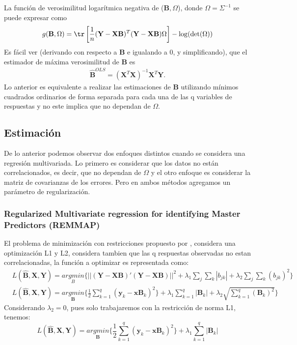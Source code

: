 \documentclass{article}
\newcommand{\X}{\mathbf{X}}
\newcommand{\x}{\mathbf{x}}
\newcommand{\Y}{\mathbf{Y}}
\newcommand{\y}{\mathbf{y}}
\newcommand{\B}{\mathbf{B}}
\begin{document}
La función de verosimilitud logarítmica negativa de ($\B, \Omega$), donde $\Omega = \Sigma^{-1}$ se puede expresar como 
\begin{align} \label{log_verosimilitud}
    g(\B,\Omega) = \tr \left[ \frac{1}{n}(\Y-\X\B)^T(\Y-\X\B)\Omega \right] -\log(\det(\Omega))
\end{align}
Es fácil ver (derivando con respecto a $\B$ e igualando a 0, y simplificando), que el estimador de máxima verosimilitud de $\B$ es 
\begin{align} \label{estimador_B_OLS}
    \hat{\B}^{OLS}=(\X^T\X)^{-1}\X^T\Y.
\end{align}
Lo anterior es equivalente a realizar las estimaciones de $\B$ utilizando mínimos cuadrados ordinarios de forma separada para cada una de las q variables de respuestas y no este implica que no dependan  de $\Omega.$ 

\subsection{Estimación}
De lo anterior podemos observar dos enfoques distintos cuando se considera una regresión multivariada. Lo primero es considerar que los datos no están correlacionados, es decir, que no dependan de $\Omega$ y el otro enfoque es considerar la matriz de covarianzas de los errores. Pero en ambos métodos agregamos un parámetro de regularización.

\subsubsection{Regularized  Multivariate regression for identifying Master Predictors (REMMAP)}

El problema de minimización con restricciones propuesto por \citep{remap}, considera una optimización L1 y L2, considera tambien que las q respuestas observadas no estan correlacionadas,  la función a optimizar es representada como:
\begin{align*}
&L(\hat{\B},\X,\Y)=  \underset{B}{argmin} \{ ||(\Y-\X\B)'(\Y-\X\B)||^{2}  + \lambda_1 \sum_{j} \sum_{k} |b_{jk}|  + \lambda_2 \sum_{j} \sum_{k} (b_{jk})^{2} \} 
\\ &L(\hat{\B},\X,\Y)=  \underset{\B}{argmin}  \{\frac{1}{2} \sum_{k=1}^{q} (\y_{k}-\x \B_{k})^{2} \} + \lambda_1 \sum_{k=1}^{q}|\B_{k}| +  \lambda_2 \sqrt{\sum_{k=1}^{q}(\B_{k})^{2}}  \}
\end{align*}  
Considerando $\lambda_2=0$, pues solo trabajaremos con la restricción de norma L1, tenemos:
$$ L(\hat{\B},\X,\Y)=  \underset{\B}{argmin} \{\frac{1}{2} \sum_{k=1}^{q} (\y_{k}-\x \B_{k})^{2} \} + \lambda_1 \sum_{k=1}^{q}|\B_{k}| $$
\end{document}
